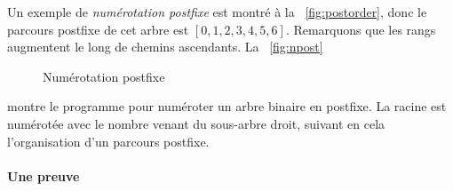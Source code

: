 Un exemple de \emph{numérotation postfixe} est montré à la
\fig~\vref{fig:postorder}, donc le parcours postfixe de cet arbre est
\([0,1,2,3,4,5,6]\). Remarquons que les rangs augmentent le long de
chemins ascendants. La
\fig~\vref{fig:npost}
\begin{figure}
\centering
{}
\caption{Numérotation postfixe\label{fig:npost}}
\end{figure}
montre le programme pour numéroter un arbre binaire en postfixe. La
racine est numérotée avec le nombre venant du sous-arbre droit, suivant
en cela l'organisation d'un parcours postfixe.

\paragraph{Une preuve}\label{proof_PreMir}

